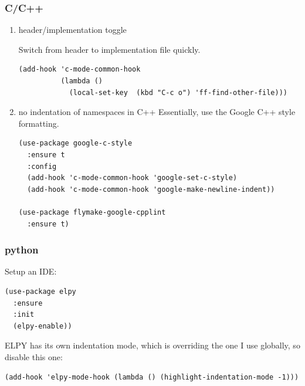 \documentclass[11pt]{article}
\begin{document}
\subsubsection{C/C++}
\label{sec:org15bdee6}
\begin{enumerate}
\item header/implementation toggle
\label{sec:orgbdda376}

Switch from header to implementation file quickly.
\begin{verbatim}
(add-hook 'c-mode-common-hook
          (lambda ()
            (local-set-key  (kbd "C-c o") 'ff-find-other-file)))
\end{verbatim}
\item no indentation of namespaces in C++
\label{sec:orga75c898}
Essentially, use the Google C++ style formatting.
\begin{verbatim}
(use-package google-c-style
  :ensure t
  :config
  (add-hook 'c-mode-common-hook 'google-set-c-style)
  (add-hook 'c-mode-common-hook 'google-make-newline-indent))

(use-package flymake-google-cpplint
  :ensure t)
\end{verbatim}
\end{enumerate}
\subsubsection{python}
\label{sec:orgccafedc}

Setup an IDE:

\begin{verbatim}
(use-package elpy
  :ensure
  :init
  (elpy-enable))
\end{verbatim}

ELPY has its own indentation mode, which is overriding the one I use
globally, so disable this one:

\begin{verbatim}
(add-hook 'elpy-mode-hook (lambda () (highlight-indentation-mode -1)))
\end{verbatim}
\end{document}
